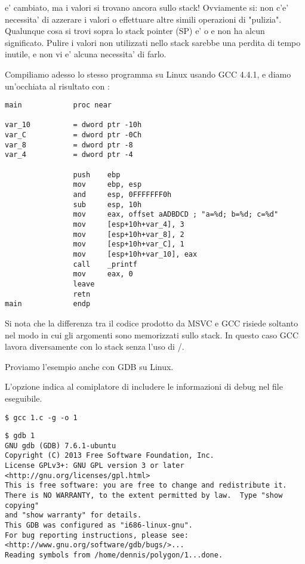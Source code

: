 \ESP e' cambiato, ma i valori si trovano ancora sullo stack!
Ovviamente si: non c'e' necessita' di azzerare i valori o effettuare altre simili operazioni di "pulizia".
Qualunque cosa si trovi sopra lo stack pointer (\ac{SP}) e'  o \IT{\garbage{}} e non ha alcun significato.
Pulire i valori non utilizzati nello stack sarebbe una perdita di tempo inutile, e non vi e' alcuna necessita' di farlo.


Compiliamo adesso lo stesso programma su Linux usando GCC 4.4.1, e diamo un'occhiata al risultato con \IDA:

\begin{lstlisting}
main            proc near

var_10          = dword ptr -10h
var_C           = dword ptr -0Ch
var_8           = dword ptr -8
var_4           = dword ptr -4

                push    ebp
                mov     ebp, esp
                and     esp, 0FFFFFFF0h
                sub     esp, 10h
                mov     eax, offset aADBDCD ; "a=%d; b=%d; c=%d"
                mov     [esp+10h+var_4], 3
                mov     [esp+10h+var_8], 2
                mov     [esp+10h+var_C], 1
                mov     [esp+10h+var_10], eax
                call    _printf
                mov     eax, 0
                leave
                retn
main            endp
\end{lstlisting}

Si nota che la differenza tra il codice prodotto da MSVC e GCC risiede soltanto nel modo in cui gli argomenti sono memorizzati sullo stack.
In questo caso GCC lavora diversamente con lo stack senza l'uso di \PUSH/\POP.


Proviamo l'esempio anche con \ac{GDB} su Linux.

L'opzione  indica al comiplatore di includere le informazioni di debug nel file eseguibile.

\begin{lstlisting}
$ gcc 1.c -g -o 1
\end{lstlisting}

\begin{lstlisting}
$ gdb 1
GNU gdb (GDB) 7.6.1-ubuntu
Copyright (C) 2013 Free Software Foundation, Inc.
License GPLv3+: GNU GPL version 3 or later <http://gnu.org/licenses/gpl.html>
This is free software: you are free to change and redistribute it.
There is NO WARRANTY, to the extent permitted by law.  Type "show copying"
and "show warranty" for details.
This GDB was configured as "i686-linux-gnu".
For bug reporting instructions, please see:
<http://www.gnu.org/software/gdb/bugs/>...
Reading symbols from /home/dennis/polygon/1...done.
\end{lstlisting}

